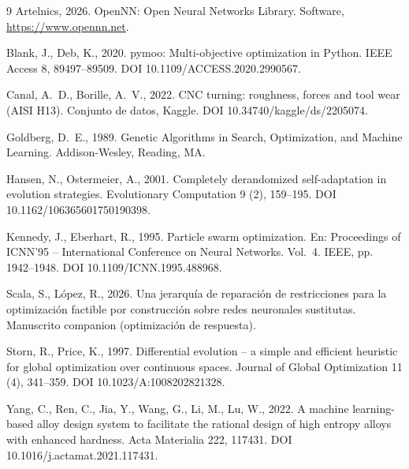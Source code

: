 \documentclass[5p,times,authoryear]{elsarticle}
\begin{document}
\begin{thebibliography}{9}
Artelnics, 2026. OpenNN: Open Neural Networks Library. Software,
\url{https://www.opennn.net}.

Blank, J., Deb, K., 2020. pymoo: Multi-objective optimization in Python. IEEE
Access 8, 89497--89509. DOI 10.1109/ACCESS.2020.2990567.

Canal, A.~D., Borille, A.~V., 2022. CNC turning: roughness, forces and tool wear
(AISI H13). Conjunto de datos, Kaggle. DOI 10.34740/kaggle/ds/2205074.

Goldberg, D.~E., 1989. Genetic Algorithms in Search, Optimization, and Machine
Learning. Addison-Wesley, Reading, MA.

Hansen, N., Ostermeier, A., 2001. Completely derandomized self-adaptation in
evolution strategies. Evolutionary Computation 9 (2), 159--195.
DOI 10.1162/106365601750190398.

Kennedy, J., Eberhart, R., 1995. Particle swarm optimization. En: Proceedings of
ICNN'95 -- International Conference on Neural Networks. Vol.~4. IEEE,
pp. 1942--1948. DOI 10.1109/ICNN.1995.488968.

Scala, S., López, R., 2026. Una jerarquía de reparación de restricciones para la
optimización factible por construcción sobre redes neuronales sustitutas. Manuscrito
companion (optimización de respuesta).

Storn, R., Price, K., 1997. Differential evolution -- a simple and efficient
heuristic for global optimization over continuous spaces. Journal of Global
Optimization 11 (4), 341--359. DOI 10.1023/A:1008202821328.

Yang, C., Ren, C., Jia, Y., Wang, G., Li, M., Lu, W., 2022. A machine learning-based
alloy design system to facilitate the rational design of high entropy alloys with
enhanced hardness. Acta Materialia 222, 117431. DOI 10.1016/j.actamat.2021.117431.
\end{thebibliography}
\end{document}
